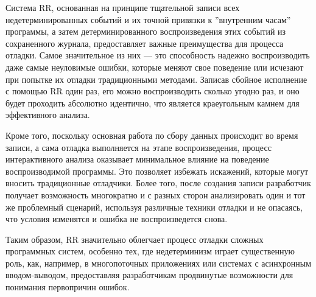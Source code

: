
Система RR, основанная на принципе тщательной записи всех недетерминированных
событий и их точной привязки к ''внутренним часам'' программы, а затем
детерминированного воспроизведения этих событий из сохраненного журнала,
предоставляет важные преимущества для процесса отладки. Самое значительное из
них — это способность надежно воспроизводить даже самые неуловимые ошибки,
которые меняют свое поведение или исчезают при попытке их отладки традиционными
методами. Записав сбойное исполнение с помощью RR один раз, его можно
воспроизводить сколько угодно раз, и оно будет проходить абсолютно идентично,
что является краеугольным камнем для эффективного анализа.

Кроме того, поскольку основная работа по сбору данных происходит во время
записи, а сама отладка выполняется на этапе воспроизведения, процесс
интерактивного анализа оказывает минимальное влияние на поведение
воспроизводимой программы. Это позволяет избежать искажений, которые могут
вносить традиционные отладчики. Более того, после создания записи разработчик
получает возможность многократно и с разных сторон анализировать один и тот же
проблемный сценарий, используя различные техники отладки и не опасаясь, что
условия изменятся и ошибка не воспроизведется снова.


Таким образом, RR значительно облегчает процесс отладки сложных программных
систем, особенно тех, где недетерминизм играет существенную роль, как,
например, в многопоточных приложениях или системах с асинхронным
вводом-выводом, предоставляя разработчикам продвинутые возможности для
понимания первопричин ошибок.